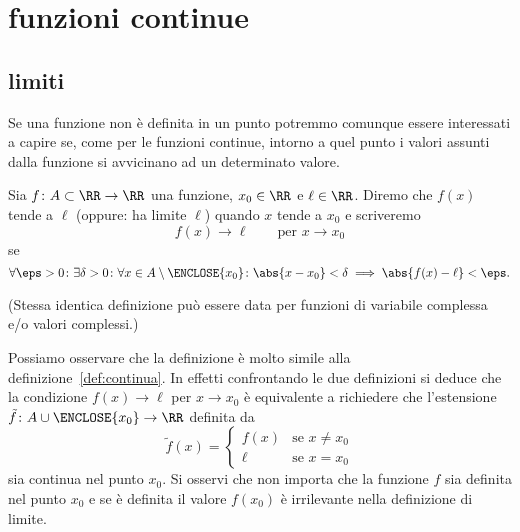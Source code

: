 \chapter{funzioni continue}

\begin{comment}
Lo scopo principale di questo corso è quello di studiare le
funzioni con dominio e codominio nei numeri reali:
\[
  f \colon A \subset \RR \to \RR.
\]
Ad esempio per ogni $n\in \ZZ$ abbiamo già definito la funzione
potenza:
\[
  f(x) = x^n.
\]
Se $n\ge 0$ si ha $f\colon \RR \to \RR$ (la funzione è definita
per ogni $x\in \RR$), se invece $n<0$ si ha
$f\colon \RR\setminus\ENCLOSE{0}\to \RR$ in quanto le potenze
con esponente negativo non sono definite se la base è $0$.
\end{comment}

\section{limiti}

Se una funzione non è definita in un punto potremmo comunque 
essere interessati a capire se, come per le funzioni continue,
intorno a quel punto i valori assunti dalla funzione si avvicinano 
ad un determinato valore.

\begin{definition}
  \label{def:limite_finito}%
  Sia $f\colon A\subset \RR \to \RR$ una funzione, 
  $x_0\in \RR$ e $\ell \in \RR$.
  Diremo che $f(x)$ tende a $\ell$ (oppure: ha limite $\ell$) 
  quando $x$ tende a $x_0$ 
  e scriveremo
  \[
    f(x) \to \ell \qquad \text{per $x\to x_0$}
  \]
  se 
  \begin{equation}\label{eq:limite_finito}
    \forall \eps>0\colon \exists \delta>0 \colon 
    \forall x \in A\setminus\ENCLOSE{x_0}\colon
    \abs{x-x_0}<\delta \implies \abs{f(x)-\ell}< \eps.
  \end{equation}

  (Stessa identica definizione può essere data per funzioni 
  di variabile complessa e/o valori complessi.)
\end{definition}

Possiamo osservare che la definizione è molto simile alla 
definizione~\ref{def:continua}. 
In effetti confrontando le due definizioni si deduce che 
la condizione $f(x)\to \ell$ per $x\to x_0$ 
è equivalente a richiedere che l'estensione $\tilde f \colon A \cup \ENCLOSE{x_0}\to \RR$ 
definita da 
\[
 \tilde f(x) = \begin{cases}
    f(x) & \text{se $x\neq x_0$}\\ 
    \ell & \text{se $x=x_0$}
 \end{cases}
\]
sia continua nel punto $x_0$. 
Si osservi che non importa che la funzione $f$ sia definita nel punto 
$x_0$ e se è definita il valore $f(x_0)$ è irrilevante nella 
definizione di limite.

